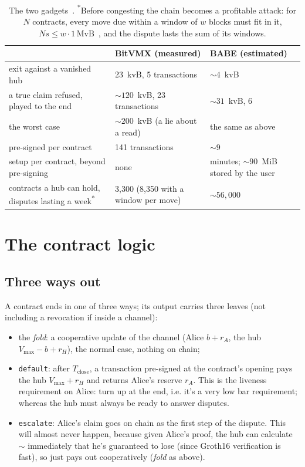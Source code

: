 \documentclass[11pt]{article}
\newcommand{\vmax}{V_{\max}}
\newcommand{\Tc}{T_{\mathrm{close}}}
\newcommand{\tx}[1]{\texttt{#1}}
\begin{document}
\begin{table}[!htp]
\centering
\small
\begin{tabularx}{\linewidth}{>{\raggedright\arraybackslash}p{58mm}LL}
\toprule
& BitVMX (measured) & BABE (estimated) \\
\midrule
exit against a vanished hub & 23~kvB, 5 transactions & ${\sim}4$~kvB \\
a true claim refused, played to the end & ${\sim}120$~kvB, 23 transactions & ${\sim}31$~kvB, 6 \\
the worst case & ${\sim}200$~kvB (a lie about a read) & the same as above \\
pre-signed per contract & 141 transactions & ${\sim}9$ \\
setup per contract, beyond pre-signing & none & minutes; ${\sim}90$~MiB stored by the user \\
contracts a hub can hold, disputes lasting a week\textsuperscript{*} & 3,300 (8,350 with a window per move) & ${\sim}56{,}000$ \\
\bottomrule
\end{tabularx}
\caption{The two gadgets~\cite{lichenbitvmx,lichenbabe}.
\textsuperscript{*}Before congesting the chain becomes a profitable
attack: for $N$ contracts, every move due within a window of $w$ blocks
must fit in it, $N s \le w \cdot 1\,\mathrm{MvB}$~\cite{floodloot}, and
the dispute lasts the sum of its windows.}
\label{tab:gadgets}
\end{table}

\section{The contract logic}
\label{sec:contract}

\subsection{Three ways out}

A contract ends in one of three ways; its output carries three leaves (not including a revocation if inside a channel):
\begin{itemize}[leftmargin=1.5em]
\item the \emph{fold}: a cooperative update of the channel (Alice
  $b + r_A$, the hub $\vmax - b + r_H$), the normal case, nothing on
  chain;
\item \tx{default}: after $\Tc$, a transaction pre-signed at the
  contract's opening pays the hub $\vmax + r_H$ and returns Alice's
  reserve $r_A$. This is the liveness requirement on Alice: turn up at the end, i.e. it's a very low bar requirement; whereas the hub must always be ready to answer disputes.
\item \tx{escalate}: Alice's claim goes on chain as the first step of
  the dispute. This will almost never happen, because given Alice's proof, the hub can calculate $\sim$ immediately that he's guaranteed to lose (since Groth16 verification is fast), so just pays out cooperatively (\emph{fold} as above).
\end{itemize}
\end{document}
